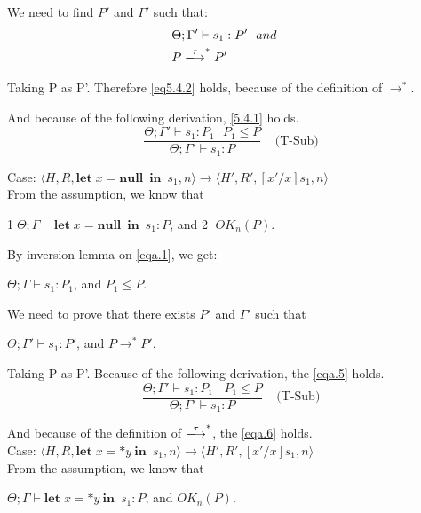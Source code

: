 \documentclass[english]{jssst_ppl} %
\newcommand\LET{\mathbf{let}\;}
\newcommand\IN{\mathbf{in}\;}
\newcommand\Rtab{\; \; \; \;}
\newcommand\NULL{\mathbf{null}\;}
\begin{document}
We need to find $P'$ and $\Gamma'$ such that:
\begin{align}
  &\Theta; \Gamma' \vdash s_{1} : P' \ \ and& \label{eq5.4.1}\\
  &P \xlongrightarrow{\tau}^{*} P'& \label{eq5.4.2}
\end{align}

Taking P as P'. Therefore \eqref{eq5.4.2} holds, because of the definition of $\rightarrow^{*}$.

And because of the following derivation, \eqref{5.4.1} holds.
$$
  \frac{\Theta; \Gamma' \vdash s_{1} : P_{1} \ \ \ P_{1} \le P}
  {\Theta; \Gamma' \vdash s_{1} : P}
  \Rtab \mbox{(T-Sub)}
$$

\noindent Case: $\langle H, R, \LET x = \NULL \  \IN \  s_{1}, n \rangle \rightarrow \langle H', R', [x'/x]s_{1}, n \rangle $\\

From the assumption, we know that
\begin{center}
\textcircled{1}$\Theta; \Gamma \vdash \LET x = \NULL \  \IN \ s_{1} : P$, and \textcircled{2} $OK_{n}(P)$.
\end{center}

By inversion lemma on \eqref{eqa.1}, we get:
\begin{center}
$\Theta; \Gamma \vdash s_{1} : P_{1}$, and $ P_{1} \le P$.
\end{center}

We need to prove that there exists $P'$ and $\Gamma'$ such that
\begin{center}
$\Theta; \Gamma' \vdash s_{1} : P'$, and $P \rightarrow^{*} P'$.
\end{center}

Taking P as P'. Because of the following derivation, the \eqref{eqa.5} holds.
$$
  \frac{\Theta; \Gamma' \vdash s_{1} : P_{1} \ \ \ \ P_{1} \le P}
  {\Theta; \Gamma' \vdash s_{1} : P}
  \Rtab \mbox{(T-Sub)}
$$

And because of the definition of $\xlongrightarrow{\tau}^{*}$, the \eqref{eqa.6} holds. \\

\noindent Case: $\langle H, R, \LET x = *y \  \IN \  s_{1}, n \rangle \rightarrow \langle H', R', [x'/x]s_{1}, n \rangle $\\

From the assumption, we know that
\begin{center}
$\Theta; \Gamma \vdash \LET x = *y \  \IN \  s_{1} : P$, and $OK_{n}(P)$.
\end{center}
\end{document}
